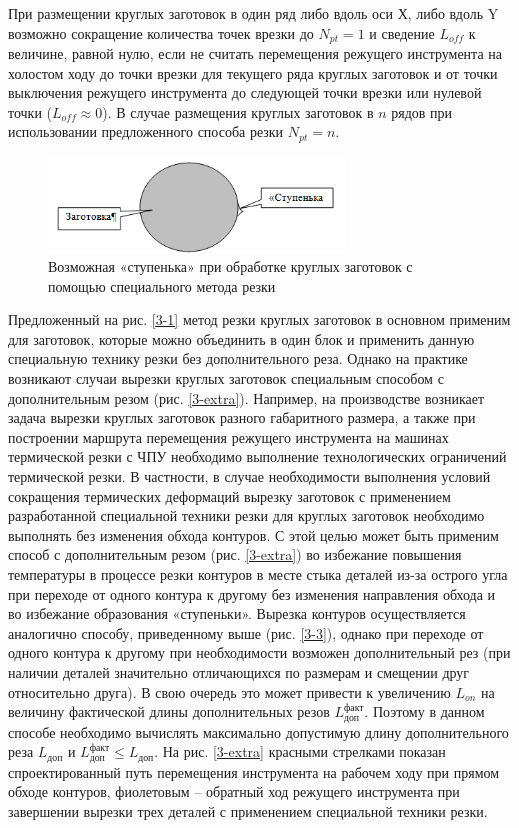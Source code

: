 \documentclass[12pt,twoside]{report}
\begin{document}
При размещении круглых заготовок в один ряд
либо вдоль оси Х, либо вдоль Y
возможно сокращение количества точек врезки до
$N_{pt}=1$
и сведение
$L_{off}$
к величине, равной нулю, если не считать перемещения
режущего инструмента на холостом ходу до точки врезки
для текущего ряда круглых заготовок и от точки выключения
режущего инструмента до следующей точки врезки или нулевой точки
($L_{off} \approx 0$).
В случае размещения круглых заготовок в $n$
рядов при использовании предложенного способа резки
$N_{pt}=n$.

\begin{figure}
  \begin{center}
  \includegraphics[width=0.7\textwidth]{hiccup.png}
  \caption{Возможная «ступенька» при обработке круглых заготовок с помощью специального метода резки}
  \label{hiccup}
  \end{center}
\end{figure}

Предложенный на рис. \ref{3-1}
метод резки круглых заготовок в основном применим для заготовок,
которые можно объединить в один блок и применить
данную специальную технику резки без дополнительного реза.
Однако на практике возникают случаи вырезки круглых заготовок
специальным способом с дополнительным резом
(рис. \ref{3-extra}).
Например, на производстве возникает задача
вырезки круглых заготовок разного габаритного размера,
а
также при построении маршрута перемещения режущего инструмента
на машинах термической резки с ЧПУ необходимо выполнение
технологических ограничений термической резки.
В частности, в случае необходимости выполнения условий
сокращения термических деформаций вырезку заготовок с
применением разработанной специальной техники резки
для круглых заготовок необходимо выполнять без изменения обхода контуров.
С этой целью может быть применим способ с дополнительным резом
(рис. \ref{3-extra})
во избежание повышения температуры в процессе резки контуров
в месте стыка деталей из-за острого угла
при переходе от одного контура к другому без изменения
направления обхода и во избежание образования «ступеньки».
Вырезка контуров осуществляется аналогично способу,
приведенному выше (рис. \ref{3-3}),
однако при переходе от одного контура к другому
при необходимости возможен дополнительный рез
(при наличии деталей значительно отличающихся по размерам и смещении друг относительно друга).
В свою очередь это может привести к увеличению
$L_{on}$
на величину фактической длины дополнительных резов
$L_\text{доп}^\text{факт}$.
Поэтому в данном способе необходимо вычислять максимально допустимую длину дополнительного реза
$L_\text{доп}$
и
$L_\text{доп}^\text{факт} \leqslant L_\text{доп}$.
На рис. \ref{3-extra}
красными стрелками показан спроектированный путь
перемещения инструмента на рабочем ходу при прямом обходе контуров,
фиолетовым – обратный ход режущего инструмента
при завершении вырезки трех деталей с
применением специальной техники резки.
\end{document}
